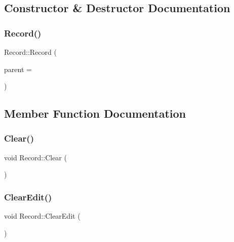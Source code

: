 \subsection{Constructor \& Destructor Documentation}
\mbox{\label{class_record_af85c9f8ff0abca5ee43b4a024557f38a}} 
\subsubsection{\texorpdfstring{Record()}{Record()}}
{\footnotesize\ttfamily Record\+::\+Record (\begin{DoxyParamCaption}\item[{Q\+Widget $\ast$}]{parent = {} }\end{DoxyParamCaption})\hspace{0.3cm}{\ttfamily [explicit]}}



\subsection{Member Function Documentation}
\mbox{\label{class_record_af70466cb248483ed2a32fb5a48a83cac}} 
\subsubsection{\texorpdfstring{Clear()}{Clear()}}
{\footnotesize\ttfamily void Record\+::\+Clear (\begin{DoxyParamCaption}{ }\end{DoxyParamCaption})}

\mbox{\label{class_record_ad33ee61f2d53795e3090426aa3ba6af0}} 
\subsubsection{\texorpdfstring{ClearEdit()}{ClearEdit()}}
{\footnotesize\ttfamily void Record\+::\+Clear\+Edit (\begin{DoxyParamCaption}{ }\end{DoxyParamCaption})}

\mbox{\label{class_record_a4c0e51ba399bdec6c9630b193914e7fb}} 
